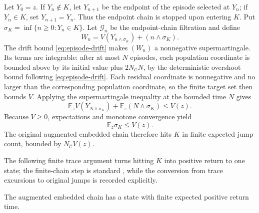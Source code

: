 Let \(Y_0=z\).  If \(Y_n\notin K\), let \(Y_{n+1}\) be the endpoint of the
episode selected at \(Y_n\); if \(Y_n\in K\), set \(Y_{n+1}=Y_n\).  Thus the
endpoint chain is stopped upon entering \(K\).  Put
\(
 \sigma_K=\inf\{n\ge0:Y_n\in K\}.
\)
Let \(\mathcal G_n\) be the endpoint-chain filtration and define
\[
 W_n=V(Y_{n\wedge\sigma_K})+(n\wedge\sigma_K).
\]
The drift bound \eqref{eq:episode-drift} makes \((W_n)\) a nonnegative
supermartingale.  Its terms are integrable: after at most \(N\) episodes, each
population coordinate is bounded above by its initial value plus
\(2N_{\mathcal C}N\), by the deterministic overshoot bound following
\eqref{eq:episode-drift}.  Each residual coordinate is nonnegative and no
larger than the corresponding population coordinate, so the finite target set
then bounds \(V\).  Applying the supermartingale inequality
at the bounded time \(N\) gives
\begin{equation}\label{eq:stopped-drift}
  \mathbb E_zV(Y_{N\wedge\sigma_K})
  +\mathbb E_z(N\wedge\sigma_K)
  \le V(z).
\end{equation}
Because \(V\ge0\), expectations and monotone convergence yield
\begin{equation}\label{eq:episodes-to-K}
  \mathbb E_z\sigma_K\le V(z).
\end{equation}
The original augmented embedded chain therefore hits \(K\) in finite
expected jump count, bounded by \(N_{\mathcal C} V(z)\).

The following finite trace argument turns hitting \(K\) into positive return
to one state; the finite-chain step is standard \citep{Norris1997}, while the
conversion from trace excursions to original jumps is recorded explicitly.

\begin{proposition}\label{prop:trace}
The augmented embedded chain has a state with finite expected positive return
time.
\end{proposition}

